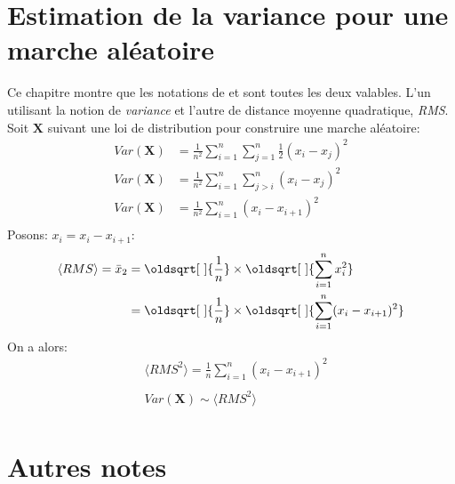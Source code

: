 \documentclass[12pt, oneside]{report}
\renewcommand*{\sqrt}[2][\ ]{\oldsqrt[#1]{#2}}
\begin{document}
\chapter*{Estimation de la variance pour une marche aléatoire}
Ce chapitre montre que les notations de \cite{Yang201445} et \cite{Gutowski2001}
sont toutes les deux valables. L’un utilisant la notion de \emph{variance} et
l’autre de distance moyenne quadratique, \emph{RMS}.\\
Soit $\mathbf{X}$ suivant une loi de distribution pour construire une marche aléatoire:
\begin{equation}
    \begin{split}
        Var(\mathbf{X}) &= \frac{1}{n^{2}} \sum_{i=1}^{n} \sum_{j=1}^{n} \frac{1}{2}(x_{i} - x_{j})^{2}\\
        Var(\mathbf{X}) &= \frac{1}{n^{2}} \sum_{i=1}^{n} \sum_{j>i}^{n} (x_{i} - x_{j})^{2}\\
        Var(\mathbf{X}) &= \frac{1}{n^{2}} \sum_{i=1}^{n} (x_{i} - x_{i+1})^{2}\\
    \end{split}
\end{equation}
Posons:  $x_{i} = x_{i} - x_{i+1}$:
\begin{equation}
    \begin{split}
        \langle RMS\rangle = \bar{x}_{2} &= \sqrt{\frac{1}{n}} \times \sqrt{\sum_{i=1}^{n}x_{i}^{2}}\\
                          &= \sqrt{\frac{1}{n}} \times \sqrt{\sum_{i=1}^{n}(x_{i} - x_{i+1})^{2}}\\
    \end{split}
\end{equation}
On a alors:
\begin{align*}
    & \langle RMS^{2}\rangle = \frac{1}{n} \sum_{i=1}^{n}(x_{i} - x_{i+1})^{2} \\\\
    & Var(\mathbf{X}) \sim \langle RMS^{2}\rangle\\
\end{align*}


\chapter*{Autres notes}
\end{document}
